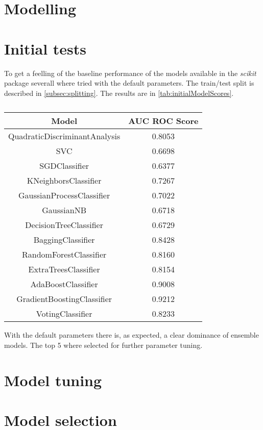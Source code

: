 \section{Modelling}
\label{sec:modelling}

\section{Initial tests}
\label{sec:initialTests}
To get a feelling of the baseline performance of the models available in
the \emph{scikit} package severall where tried with the default parameters.
The train/test split is described in \vref{subsec:splitting}.
The results are in \vref{tab:initialModelScores}.

\begin{table}[!h]
    \caption{}
    \label{tab:initialModelScores}
    \centering
    \begin{tabular}{cc}
        Model & AUC ROC Score \\
        \hline
        QuadraticDiscriminantAnalysis & 0.8053 \\
        SVC & 0.6698 \\
        SGDClassifier & 0.6377 \\
        KNeighborsClassifier & 0.7267 \\
        GaussianProcessClassifier & 0.7022 \\
        GaussianNB & 0.6718 \\
        DecisionTreeClassifier & 0.6729 \\
        BaggingClassifier & 0.8428 \\
        RandomForestClassifier & 0.8160 \\
        ExtraTreesClassifier & 0.8154 \\
        AdaBoostClassifier & 0.9008 \\
        GradientBoostingClassifier & 0.9212 \\
        VotingClassifier & 0.8233 \\
    \end{tabular}
\end{table}

With the default parameters there is, as expected, a clear dominance of
ensemble models.
The top 5 where selected for further parameter tuning.

\section{Model tuning}
\label{sec:modelTuning}

\blindtext

\section{Model selection}
\label{sec:modelSelection}

\blindtext
